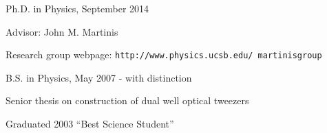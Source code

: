 \begin{list3}
\item Ph.D. in Physics, September 2014
\item Advisor: John M. Martinis
\item Research group webpage: \texttt{http://www.physics.ucsb.edu/~martinisgroup}
\end{list3}

\begin{list3}
\item B.S. in Physics, May 2007 - with distinction
\item Senior thesis on construction of dual well optical tweezers
\end{list3}

\begin{list3}
\item Graduated 2003 ``Best Science Student''
\end{list3}
